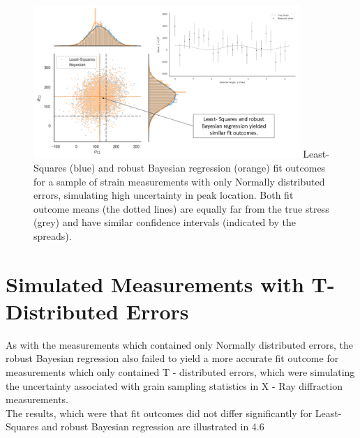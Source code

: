 \begin{figure}[H]
 	\centering
 	\includegraphics[width=0.9\textwidth]{chapters/chapter03/fig03/s63D.png}
 	\mycaption
 	{Least-Squares (blue) and robust Bayesian regression (orange) fit outcomes for a sample of strain measurements with only Normally distributed errors, simulating high uncertainty in peak location. Both fit outcome means (the dotted lines) are equally far from the true stress (grey) and have similar confidence intervals (indicated by the spreads).}
    \label{fig:RHP02}
 \end{figure}




\section{Simulated Measurements with T- Distributed Errors}
\label{sec:sec01}

As with the measurements which contained only Normally distributed errors, the robust Bayesian regression also failed to yield a more accurate fit outcome for measurements which only contained T - distributed errors, which were simulating the uncertainty associated with grain sampling statistics in X - Ray diffraction measurements.\\

The results, which were that fit outcomes did not differ significantly for Least-Squares and robust Bayesian regression are illustrated in 4.6 \\


